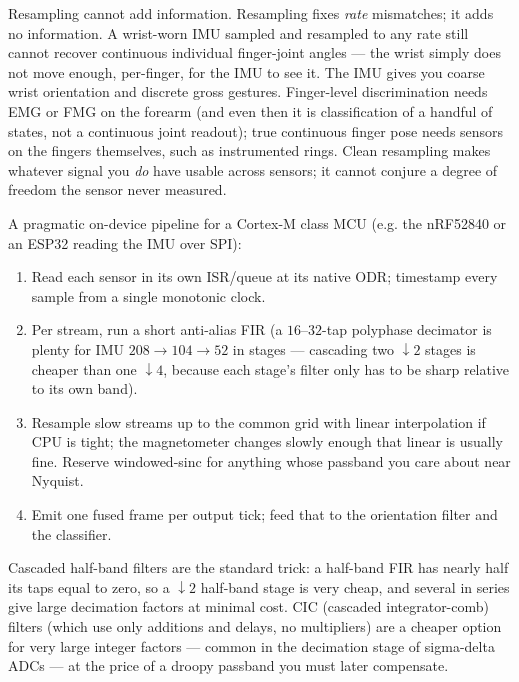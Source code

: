 \begin{aestheticbox}
Resampling cannot add information.
Resampling fixes \emph{rate} mismatches; it adds no information. A wrist-worn IMU sampled and
resampled to any rate still cannot recover continuous individual finger-joint
angles --- the wrist simply does not move enough, per-finger, for the IMU to see
it. The IMU gives you coarse wrist orientation and discrete gross gestures.
Finger-level discrimination needs EMG or FMG on the forearm (and even then it is
classification of a handful of states, not a continuous joint readout); true
continuous finger pose needs sensors on the fingers themselves, such as
instrumented rings. Clean resampling makes whatever signal you \emph{do} have
usable across sensors; it cannot conjure a degree of freedom the sensor never
measured.
\end{aestheticbox}

\begin{buildbox}
A pragmatic on-device pipeline for a Cortex-M class MCU (e.g. the nRF52840 or an
ESP32 reading the IMU over SPI):
\begin{enumerate}
  \item Read each sensor in its own ISR/queue at its native ODR; timestamp every
  sample from a single monotonic clock.
  \item Per stream, run a short anti-alias FIR (a $16$--$32$-tap polyphase
  decimator is plenty for IMU $208\to104\to52$ in stages --- cascading two
  $\downarrow 2$ stages is cheaper than one $\downarrow 4$, because each stage's
  filter only has to be sharp relative to its own band).
  \item Resample slow streams up to the common grid with linear interpolation if
  CPU is tight; the magnetometer changes slowly enough that linear is usually
  fine. Reserve windowed-sinc for anything whose passband you care about near
  Nyquist.
  \item Emit one fused frame per output tick; feed that to the orientation filter
  and the classifier.
\end{enumerate}
Cascaded half-band filters are the standard trick: a half-band FIR has nearly
half its taps equal to zero, so a $\downarrow 2$ half-band stage is very
cheap, and several in series give large decimation factors at minimal cost. CIC
(cascaded integrator-comb) filters (which use only additions and delays, no multipliers) are a cheaper option
for very large integer factors --- common in the decimation stage of
sigma-delta ADCs --- at the price of a droopy passband you must later
compensate.
\end{buildbox}

